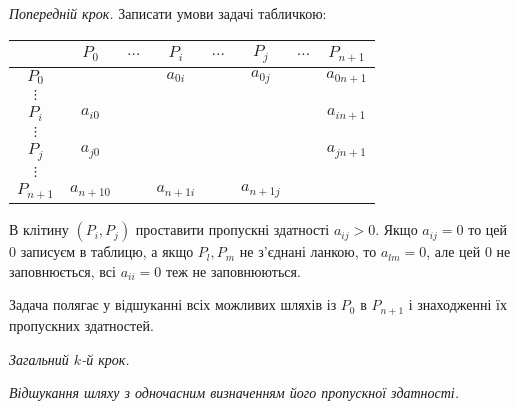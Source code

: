 \documentclass[12pt,a4paper]{book}
\newenvironment{slim_enumerate}{
\begin{enumerate}
  \setlength{\itemsep}{1pt}
  \setlength{\parskip}{0pt}
  \setlength{\parsep}{0pt}}
{\end{enumerate}}
\begin{document}
\begin{slim_enumerate}
  \item {\it Попередній крок.} Записати умови задачі табличкою:\\
\begin{tabular}{ | c | c | c | c | c | c | c | c | }
\hline
	&	$P_0$	&	$\dots$	&	$P_i$	&	$\dots$	&	$P_j$	&	$\dots$	&	$P_{n+1}$\\
\hline
$P_0	$&		&		&	$a_{0 i}$	&		&	$a_{0 j}$	&		&	$a_{0 n+1}$\\
\hline
$\vdots$	&		&		&		&		&		&		&\\
\hline
$P_i$	&	$a_{i 0}$	&		&		&		&		&		& $a_{i n+1}$\\
\hline
$\vdots$	&		&		&		&		&		&		&\\
\hline
$P_j$	&	$a_{j 0}$	&		&		&		&		&		& $a_{j n+1}$\\
\hline
$\vdots$	&		&		&		&		&		&		&\\
\hline
$P_{n+1}$	&	$a_{n+1 0}$	&		&	$a_{n+1 i}$	&		&	$a_{n+1 j}$	&		&\\
\hline
\end{tabular}

В клітину $(P_i, P_j)$ проставити пропускні здатності $a_{ij}>0$. Якщо $a_{ij}=0$ то цей 0 записуєм в таблицю, а якщо $P_l, P_m$ не з’єднані ланкою, то $a_{l m} = 0$, але цей 0 не заповнюється, всі $a_{ii}=0$ теж не заповнюються.

Задача полягає у відшуканні всіх можливих шляхів із $P_0$ в $P_{n+1}$ і знаходженні їх пропускних здатностей.

  \item {\it Загальний $k$-й крок.}
  \begin{slim_enumerate}
    \item {\it Відшукання шляху з одночасним визначенням його пропускної здатності.}


\end{slim_enumerate}
\end{slim_enumerate}
\end{document}
